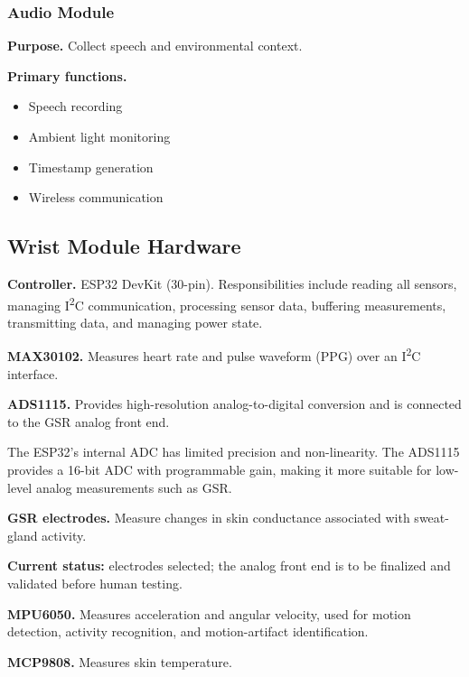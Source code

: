 \subsubsection{Audio Module}
\textbf{Purpose.} Collect speech and environmental context.

\textbf{Primary functions.}
\begin{itemize}
    \item Speech recording
    \item Ambient light monitoring
    \item Timestamp generation
    \item Wireless communication
\end{itemize}

\subsection{Wrist Module Hardware}
\label{sec:wrist-module-hardware}

\textbf{Controller.} ESP32 DevKit (30-pin). Responsibilities include reading all sensors, managing I\textsuperscript{2}C communication, processing sensor data, buffering measurements, transmitting data, and managing power state.

\textbf{MAX30102.} Measures heart rate and pulse waveform (PPG) over an I\textsuperscript{2}C interface.

\textbf{ADS1115.} Provides high-resolution analog-to-digital conversion and is connected to the GSR analog front end.

\begin{designnote}
The ESP32's internal ADC has limited precision and non-linearity. The ADS1115 provides a 16-bit ADC with programmable gain, making it more suitable for low-level analog measurements such as GSR.
\end{designnote}

\textbf{GSR electrodes.} Measure changes in skin conductance associated with sweat-gland activity.

\begin{requirementbox}
\textbf{Current status:} electrodes selected; the analog front end is to be finalized and validated before human testing.
\end{requirementbox}

\textbf{MPU6050.} Measures acceleration and angular velocity, used for motion detection, activity recognition, and motion-artifact identification.

\textbf{MCP9808.} Measures skin temperature.

